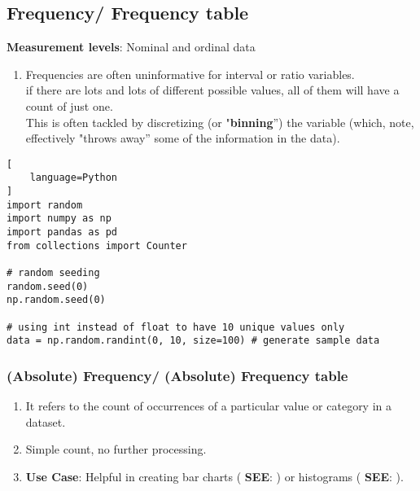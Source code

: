 \subsection{Frequency/ Frequency table \cite{statistics/book/Statistics-for-Data-Scientists/Maurits-Kaptein}}\label{Data/Describing Data/Frequency or Frequency table}

\textbf{Measurement levels}: Nominal and ordinal data \hfill \cite{statistics/book/Statistics-for-Data-Scientists/Maurits-Kaptein}

\vspace{0.3cm}

\begin{enumerate}
    \item Frequencies are often uninformative for interval or ratio variables. \hfill \cite{statistics/book/Statistics-for-Data-Scientists/Maurits-Kaptein}\\
    if there are lots and lots of different possible values, all of them will have a count of just one. \hfill \cite{statistics/book/Statistics-for-Data-Scientists/Maurits-Kaptein}\\
    This is often tackled by discretizing (or "\textbf{binning}”\label{Data/Describing Data/Frequency or Frequency table/binning}) the variable (which, note, effectively "throws away” some of the information in the data). \hfill \cite{statistics/book/Statistics-for-Data-Scientists/Maurits-Kaptein}

    
\end{enumerate}


\begin{lstlisting}[
    language=Python
]
import random
import numpy as np
import pandas as pd
from collections import Counter

# random seeding
random.seed(0)
np.random.seed(0)

# using int instead of float to have 10 unique values only
data = np.random.randint(0, 10, size=100) # generate sample data
\end{lstlisting}


\subsubsection{(Absolute) Frequency/ (Absolute) Frequency table \cite{statistics/book/Statistics-for-Data-Scientists/Maurits-Kaptein}}\label{Data/Describing Data/Frequency or Frequency table/Absolute}

\begin{enumerate}
    \item It refers to the count of occurrences of a particular value or category in a dataset. \hfill \cite{common/online/chatgpt}

    \item Simple count, no further processing. \hfill \cite{common/online/chatgpt}

    \item \textbf{Use Case}: Helpful in creating bar charts ( \textbf{SEE}:  ) or histograms ( \textbf{SEE}:  ). \hfill \cite{common/online/chatgpt}
\end{enumerate}


